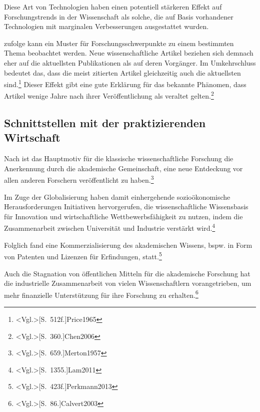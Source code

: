 Diese Art von Technologien haben einen potentiell stärkeren Effekt auf Forschungstrends in der Wissenschaft als solche, die auf Basis vorhandener Technologien mit marginalen Verbesserungen ausgestattet wurden.

 zufolge kann ein Muster für Forschungsschwerpunkte zu einem bestimmten Thema beobachtet werden. Neue wissenschaftliche Artikel beziehen sich demnach eher auf die aktuellsten Publikationen als auf deren Vorgänger. Im Umkehrschluss bedeutet das, dass die meist zitierten Artikel gleichzeitig auch die aktuellsten sind.\footnote{\citeNP<Vgl.>[S.~512f.]{Price1965}} Dieser Effekt gibt eine gute Erklärung für das bekannte Phänomen, dass Artikel wenige Jahre nach ihrer Veröffentlichung als veraltet gelten.\footnote{\citeNP<Vgl.>[S.~360.]{Chen2006}}

\subsection{Schnittstellen mit der praktizierenden Wirtschaft}
Nach  ist das Hauptmotiv für die klassische wissenschaftliche Forschung die Anerkennung durch die akademische Gemeinschaft, eine neue Entdeckung vor allen anderen Forschern veröffentlicht zu haben.\footnote{\citeNP<Vgl.>[S.~659.]{Merton1957}}

Im Zuge der Globalisierung haben damit einhergehende sozioökonomische Herausforderungen Initiativen hervorgerufen, die wissenschaftliche Wissensbasis für Innovation und wirtschaftliche Wettbewerbsfähigkeit zu nutzen, indem die Zusammenarbeit zwischen Universität und Industrie verstärkt wird.\footnote{\citeNP<Vgl.>[S.~1355.]{Lam2011}}

Folglich fand eine Kommerzialisierung des akademischen Wissens, bspw. in Form von Patenten und Lizenzen für Erfindungen, statt.\footnote{\citeNP<Vgl.>[S.~423f.]{Perkmann2013}}

Auch die Stagnation von öffentlichen Mitteln für die akademische Forschung hat die industrielle Zusammenarbeit von vielen Wissenschaftlern vorangetrieben, um mehr finanzielle Unterstützung für ihre Forschung zu erhalten.\footnote{\citeNP<Vgl.>[S.~86.]{Calvert2003}}